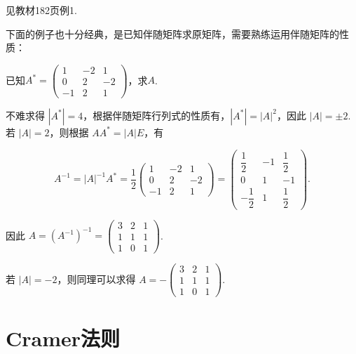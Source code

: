 \begin{solution}
    见教材182页例1.
\end{solution}

下面的例子也十分经典，是已知伴随矩阵求原矩阵，需要熟练运用伴随矩阵的性质：
\begin{example}
    已知$A^*=\begin{pmatrix}
        1 & -2 & 1 \\ 0 & 2 & -2 \\ -1 & 2 & 1
    \end{pmatrix}$，求$A$.
\end{example}

\begin{solution}
    不难求得 $|A^*| = 4$，根据伴随矩阵行列式的性质有，$|A^*| = |A|^2$，因此 $|A| = \pm 2$. 若 $|A| = 2$，则根据 $AA^* = |A|E$，有

    \[A^{-1} = |A|^{-1}A^* = \frac{1}{2}\begin{pmatrix}
            1 & -2 & 1 \\ 0 & 2 & -2 \\ -1 & 2 & 1
        \end{pmatrix} = \begin{pmatrix}
            \dfrac{1}{2} & -1 & \dfrac{1}{2} \\ 0 & 1 & -1 \\ -\dfrac{1}{2} & 1 & \dfrac{1}{2}
        \end{pmatrix}.\]

    因此 $A = (A^{-1})^{-1} = \begin{pmatrix}
            3 & 2 & 1 \\ 1 & 1 & 1 \\ 1 & 0 & 1
        \end{pmatrix}$.

    若 $|A| = -2$，则同理可以求得 $A = -\begin{pmatrix}
            3 & 2 & 1 \\ 1 & 1 & 1 \\ 1 & 0 & 1
        \end{pmatrix}$.
\end{solution}

\section{Cramer法则}

